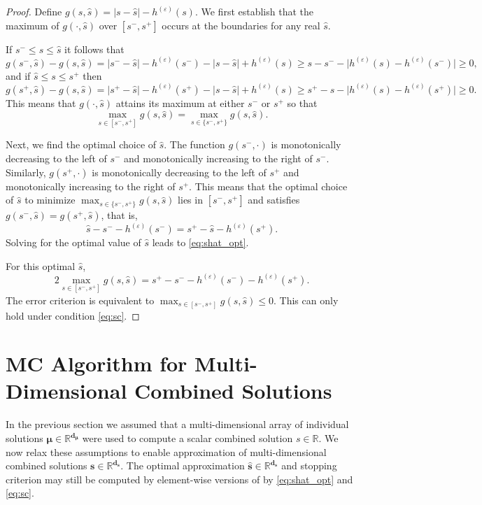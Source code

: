 \documentclass[graybox]{svmult}
\begin{document}
\begin{proof}
    Define $g(s,\hat{s})=\lvert s - \hat{s} \rvert -h^{(\varepsilon)}(s)$. We first establish that the maximum of $g(\cdot,\hat{s})$ over $[s^-,s^+]$ occurs at the boundaries for any real $\hat{s}$.  
    
    If  $s^- \leq s \leq \hat{s}$ it follows that 
    $$g(s^-,\hat{s})-g(s,\hat{s}) = \lvert s^- - \hat{s} \rvert -h^{(\varepsilon)}(s^-) - \lvert s - \hat{s} \rvert  + h^{(\varepsilon)}(s) \geq s - s^- - \lvert h^{(\varepsilon)}(s)-h^{(\varepsilon)}(s^-) \rvert \geq 0,$$
    and if $\hat{s} \leq s \leq s^+$ then 
    $$g(s^+,\hat{s})-g(s,\hat{s}) = \lvert s^+ - \hat{s} \rvert -h^{(\varepsilon)}(s^+) - \lvert s - \hat{s} \rvert  + h^{(\varepsilon)}(s) \geq s^+ - s - \lvert h^{(\varepsilon)}(s)-h^{(\varepsilon)}(s^+) \rvert \geq 0.$$
    This means that $g(\cdot,\hat{s})$ attains its maximum at either $s^-$ or $s^+$ so that
    \begin{equation*}
        \max_{s \in [s^-,s^+]} g(s,\hat{s}) = \max_{s \in \{s^-,s^+\}} g(s,\hat{s}).
    \end{equation*}
    
    Next, we find the optimal choice of $\hat{s}$.  The function $g(s^-,\cdot)$ is monotonically decreasing to the left of  $s^-$ and monotonically increasing to the right of $s^-$. Similarly, $g(s^+,\cdot)$ is monotonically decreasing to the left of $s^+$ and monotonically increasing to the right of $s^+$. This means that the optimal choice of $\hat{s}$ to minimize $\max_{s \in \{s^-,s^+\}} g(s,\hat{s})$ lies in $[s^-,s^+]$ and satisfies $g(s^-,\hat{s}) = g(s^+,\hat{s})$, that is, 
    $$\hat{s} - s^- - h^{(\varepsilon)}(s^-) = s^+ - \hat{s} - h^{(\varepsilon)}(s^+).$$
    Solving for the optimal value of $\hat{s}$ leads to \eqref{eq:shat_opt}.
    
    For this optimal $\hat{s}$, 
    $$2 \max_{s \in [s^-,s^+]} g(s,\hat{s}) =  s^+  -  s^-  - h^{(\varepsilon)}(s^-) - h^{(\varepsilon)}(s^+).$$
    The error criterion is equivalent to $\max_{s \in [s^-,s^+]} g(s,\hat{s}) \le 0 $.  This can only hold under condition  \eqref{eq:sc}. 
\end{proof}

\section{MC Algorithm for Multi-Dimensional Combined Solutions} \label{sec: Vectorized Implementation}

In the previous section we assumed that a multi-dimensional array of individual solutions $\boldsymbol{\mu} \in \mathbb{R}^{\boldsymbol{d}_{\boldsymbol{\mu}}}$ were used to compute a scalar combined solution $s \in \mathbb{R}$. We now relax these assumptions to enable approximation of multi-dimensional combined solutions $\boldsymbol{s} \in \mathbb{R}^{\boldsymbol{d}_{\boldsymbol{s}}}$. The optimal approximation $\hat{\boldsymbol{s}} \in \mathbb{R}^{\boldsymbol{d}_{\boldsymbol{s}}}$ and stopping criterion may still be computed by element-wise versions of by \eqref{eq:shat_opt} and \eqref{eq:sc}. 
\end{document}
